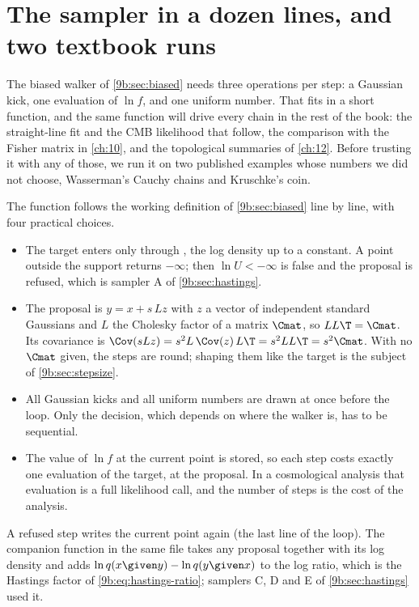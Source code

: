 \section{The sampler in a dozen lines, and two textbook runs}
\label{9b:sec:code}

The biased walker of \cref{9b:sec:biased} needs three operations per step: a Gaussian kick, one
evaluation of $\ln f$, and one uniform number. That fits in a short function, and the same
function will drive every chain in the rest of the book: the straight-line fit and the CMB
likelihood that follow, the comparison with the Fisher matrix in \cref{ch:10}, and the
topological summaries of \cref{ch:12}. Before trusting it with any of those, we run it on two
published examples whose numbers we did not choose, Wasserman's Cauchy chains and Kruschke's
coin.


The function follows the working definition of \cref{9b:sec:biased} line by line, with four
practical choices.
\begin{itemize}[itemsep=1pt]
  \item The target enters only through , the log density up to a constant. A point
        outside the support returns $-\infty$; then $\ln U<-\infty$ is false and the proposal
        is refused, which is sampler A of \cref{9b:sec:hastings}.
  \item The proposal is $y=x+s\,L z$ with $z$ a vector of independent standard Gaussians and
        $L$ the Cholesky factor of a matrix $\Cmat$, so $LL\T=\Cmat$. Its covariance is
        $\Cov(sLz)=s^2L\,\Cov(z)\,L\T=s^2LL\T=s^2\Cmat$. With no $\Cmat$ given, the steps are
        round; shaping them like the target is the subject of \cref{9b:sec:stepsize}.
  \item All Gaussian kicks and all uniform numbers are drawn at once before the loop. Only the
        decision, which depends on where the walker is, has to be sequential.
  \item The value of $\ln f$ at the current point is stored, so each step costs exactly one
        evaluation of the target, at the proposal. In a cosmological analysis that evaluation
        is a full likelihood call, and the number of steps is the cost of the analysis.
\end{itemize}
A refused step writes the current point again (the last line of the loop). The companion function  in the
same file takes any proposal together with its log density  and adds
$\ln q(x\given y)-\ln q(y\given x)$ to the log ratio, which is the Hastings factor of
\eqref{9b:eq:hastings-ratio}; samplers C, D and E of \cref{9b:sec:hastings} used it.

